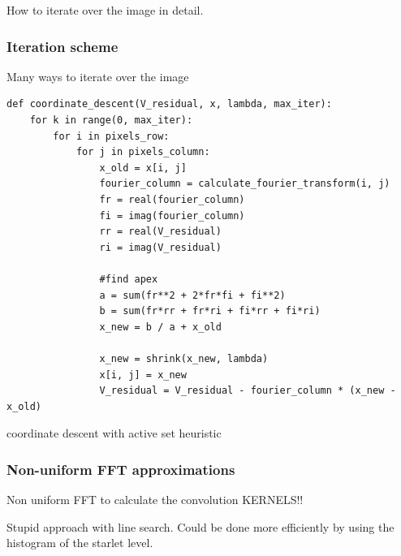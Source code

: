 How to iterate over the image in detail.

\subsubsection{Iteration scheme}
Many ways to iterate over the image

\begin{lstlisting} 
def coordinate_descent(V_residual, x, lambda, max_iter):
	for k in range(0, max_iter):
		for i in pixels_row:
			for j in pixels_column:
				x_old = x[i, j]
				fourier_column = calculate_fourier_transform(i, j)
				fr = real(fourier_column)
				fi = imag(fourier_column)
				rr = real(V_residual)
				ri = imag(V_residual)
				
				#find apex
				a = sum(fr**2 + 2*fr*fi + fi**2)
				b = sum(fr*rr + fr*ri + fi*rr + fi*ri)
				x_new = b / a + x_old
				
				x_new = shrink(x_new, lambda)
				x[i, j] = x_new
				V_residual = V_residual - fourier_column * (x_new - x_old)
\end{lstlisting}\label{cd:implementation}

coordinate descent with active set heuristic

\subsubsection{Non-uniform FFT approximations}
Non uniform FFT to calculate the convolution KERNELS!!


Stupid approach with line search. Could be done more efficiently by using the histogram of the starlet level.

